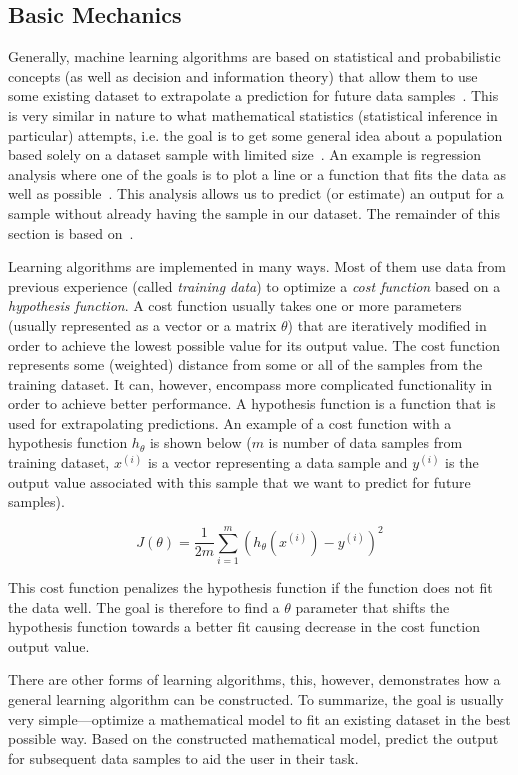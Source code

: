 \subsection{Basic Mechanics}

Generally, machine learning algorithms are based on statistical and probabilistic concepts (as well as decision and information theory) that allow them to use some existing dataset to extrapolate a prediction for future data samples~\cite{bishop2006pattern}. This is very similar in nature to what mathematical statistics (statistical inference in particular) attempts, i.e. the goal is to get some general idea about a population based solely on a dataset sample with limited size~\cite{upton2014dictionary}. An example is regression analysis where one of the goals is to plot a line or a function that fits the data as well as possible~\cite{fox1997applied}. This analysis allows us to predict (or estimate) an output for a sample without already having the sample in our dataset. The remainder of this section is based on~\cite{mitchell1997machine}.

Learning algorithms are implemented in many ways. Most of them use data from previous experience (called \textit{training data}) to optimize a \textit{cost function} based on a \textit{hypothesis function}. A cost function usually takes one or more parameters (usually represented as a vector or a matrix $\theta$) that are iteratively modified in order to achieve the lowest possible value for its output value. The cost function represents some (weighted) distance from some or all of the samples from the training dataset. It can, however, encompass more complicated functionality in order to achieve better performance. A hypothesis function is a function that is used for extrapolating predictions. An example of a cost function with a hypothesis function $h_\theta$ is shown below ($m$ is number of data samples from training dataset, $x^{(i)}$ is a vector representing a data sample and $y^{(i)}$ is the output value associated with this sample that we want to predict for future samples).

$$J(\theta) = \frac{1}{2m}\sum_{i=1}^m(h_\theta(x^{(i)}) - y^{(i)})^2$$

This cost function penalizes the hypothesis function if the function does not fit the data well. The goal is therefore to find a $\theta$ parameter that shifts the hypothesis function towards a better fit causing decrease in the cost function output value.

There are other forms of learning algorithms, this, however, demonstrates how a general learning algorithm can be constructed. To summarize, the goal is usually very simple---optimize a mathematical model to fit an existing dataset in the best possible way. Based on the constructed mathematical model, predict the output for subsequent data samples to aid the user in their task.

